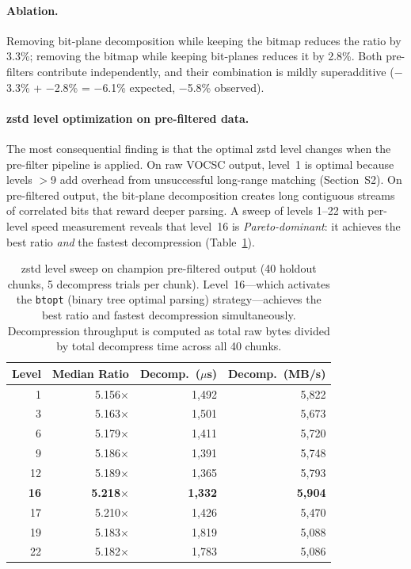 \documentclass[10pt,twocolumn,letterpaper]{article}
\begin{document}
\paragraph{Ablation.}
Removing bit-plane decomposition while keeping the bitmap reduces the ratio by 3.3\%; removing the bitmap while keeping bit-planes reduces it by 2.8\%.
Both pre-filters contribute independently, and their combination is mildly superadditive ($-$3.3\% + $-$2.8\% = $-$6.1\% expected, $-$5.8\% observed).

\paragraph{zstd level optimization on pre-filtered data.}
The most consequential finding is that the optimal zstd level changes when the pre-filter pipeline is applied.
On raw VOCSC output, level~1 is optimal because levels $>$9 add overhead from unsuccessful long-range matching (Section~S2).
On pre-filtered output, the bit-plane decomposition creates long contiguous streams of correlated bits that reward deeper parsing.
A sweep of levels 1--22 with per-level speed measurement reveals that level~16 is \emph{Pareto-dominant}: it achieves the best ratio \emph{and} the fastest decompression (Table~\ref{tab:extended_summary}).

\begin{table}[h]
\centering
\caption{zstd level sweep on champion pre-filtered output (40 holdout chunks, 5 decompress trials per chunk). Level~16---which activates the \texttt{btopt} (binary tree optimal parsing) strategy---achieves the best ratio and fastest decompression simultaneously. Decompression throughput is computed as total raw bytes divided by total decompress time across all 40 chunks.}
\label{tab:extended_summary}
\footnotesize
\begin{tabular}{rrrr}
\toprule
Level & Median Ratio & Decomp.\ ($\mu$s) & Decomp.\ (MB/s) \\
\midrule
1  & 5.156$\times$ & 1{,}492 & 5{,}822 \\
3  & 5.163$\times$ & 1{,}501 & 5{,}673 \\
6  & 5.179$\times$ & 1{,}411 & 5{,}720 \\
9  & 5.186$\times$ & 1{,}391 & 5{,}748 \\
12 & 5.189$\times$ & 1{,}365 & 5{,}793 \\
\textbf{16} & \textbf{5.218}$\times$ & \textbf{1{,}332} & \textbf{5{,}904} \\
17 & 5.210$\times$ & 1{,}426 & 5{,}470 \\
19 & 5.183$\times$ & 1{,}819 & 5{,}088 \\
22 & 5.182$\times$ & 1{,}783 & 5{,}086 \\
\bottomrule
\end{tabular}
\end{table}
\end{document}

